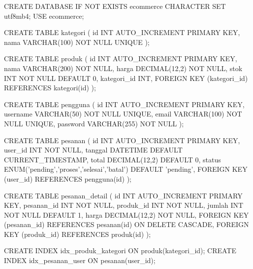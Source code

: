 \begin{webcode}[language=SQL, caption={SQL lengkap untuk skema e-commerce}]
CREATE DATABASE IF NOT EXISTS ecommerce CHARACTER SET utf8mb4;
USE ecommerce;

CREATE TABLE kategori (
  id   INT AUTO_INCREMENT PRIMARY KEY,
  nama VARCHAR(100) NOT NULL UNIQUE
);

CREATE TABLE produk (
  id          INT AUTO_INCREMENT PRIMARY KEY,
  nama        VARCHAR(200) NOT NULL,
  harga       DECIMAL(12,2) NOT NULL,
  stok        INT NOT NULL DEFAULT 0,
  kategori_id INT,
  FOREIGN KEY (kategori_id) REFERENCES kategori(id)
);

CREATE TABLE pengguna (
  id       INT AUTO_INCREMENT PRIMARY KEY,
  username VARCHAR(50) NOT NULL UNIQUE,
  email    VARCHAR(100) NOT NULL UNIQUE,
  password VARCHAR(255) NOT NULL
);

CREATE TABLE pesanan (
  id      INT AUTO_INCREMENT PRIMARY KEY,
  user_id INT NOT NULL,
  tanggal DATETIME DEFAULT CURRENT_TIMESTAMP,
  total   DECIMAL(12,2) DEFAULT 0,
  status  ENUM('pending','proses','selesai','batal') DEFAULT 'pending',
  FOREIGN KEY (user_id) REFERENCES pengguna(id)
);

CREATE TABLE pesanan_detail (
  id         INT AUTO_INCREMENT PRIMARY KEY,
  pesanan_id INT NOT NULL,
  produk_id  INT NOT NULL,
  jumlah     INT NOT NULL DEFAULT 1,
  harga      DECIMAL(12,2) NOT NULL,
  FOREIGN KEY (pesanan_id) REFERENCES pesanan(id) ON DELETE CASCADE,
  FOREIGN KEY (produk_id) REFERENCES produk(id)
);

CREATE INDEX idx_produk_kategori ON produk(kategori_id);
CREATE INDEX idx_pesanan_user ON pesanan(user_id);
\end{webcode}

